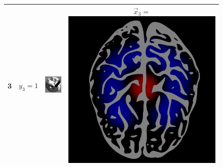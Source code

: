 \begin{figure}
\begin{tabular}{|c|cc|c|}
3 & $y_3 = 1$ & \includegraphics[scale = 0.26]{../../proposal/img3.png} & $\vec{x}_3 = $\includegraphics[scale = 0.035]{../../proposal/brain4.png} \\ \hline

\end{tabular}
\end{figure}
